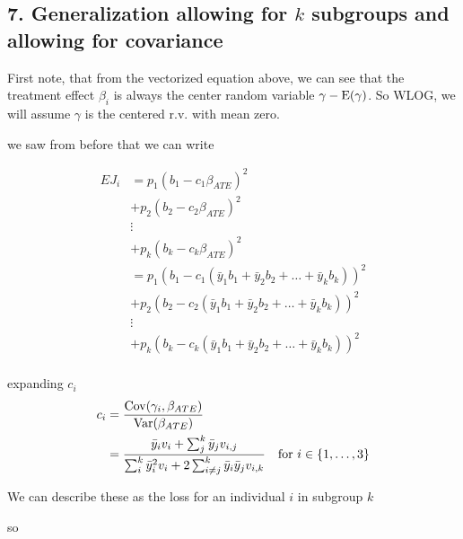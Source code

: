 \subsection*{7. Generalization allowing for $k$ subgroups and allowing for covariance}

First note, that from the vectorized equation above, we can see that the treatment effect $\beta_i$  is always the center random variable $\gamma - \mathrm{E}(\gamma)$. So WLOG, we will assume $\gamma$ is the centered r.v. with mean zero.



we saw from before that we can write

\begin{align*}
	E J_i &=  p_1 ( b_1 - c_1 \beta_{ATE})^2 \\
		  & + p_2 ( b_2 - c_2 \beta_{ATE})^2 \\
		  &\vdots \\
		  &+ p_k ( b_k -  c_k \beta_{ATE})^2 \\
		  &=p_1 ( b_1 - c_1 (\bar{y}_1 b_1 + \bar{y}_2 b_2 + \ldots + \bar{y}_k b_k ))^2 \\
		  &+ p_2 ( b_2 - c_2 (\bar{y}_1 b_1 +  \bar{y}_2 b_2 + \ldots + \bar{y}_k b_k ))^2 \\
		  &\vdots \\
		  &+ p_k ( b_k - c_k (\bar{y}_1 b_1 +\bar{y}_2 b_2 +  \ldots + \bar{y}_k b_k ))^2 \\
\end{align*}

expanding $c_i$ 
\begin{align*}
	c_i &= \frac{\mathrm{Cov}(\gamma_i, \beta_{ATE})}{\mathrm{Var}(\beta_{ATE})} \\
		&= \frac{\bar{y}_i v_{i} + \sum_{j}^{k} \bar{y}_j v_{i,j} }{\sum_i^k \bar{y}_i^2 v_i + 2 \sum_{i \neq j}^k \bar{y}_i\bar{y}_j v_{i,k} } \quad \text{for $i \in \{1,\ldots,3\}$} \\
\end{align*}

We can describe these as the loss for an individual $i$ in subgroup $k$ 

so 


